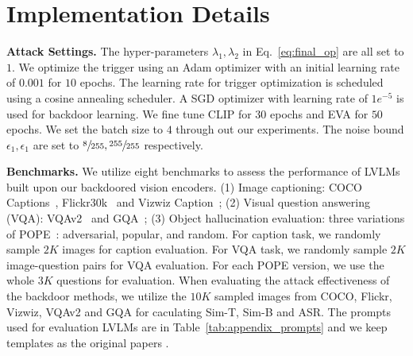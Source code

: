 \section{Implementation Details}
\label{appendix:imple_details}
\textbf{Attack Settings.} The hyper-parameters $\lambda_1, \lambda_2$ in Eq.~\ref{eq:final_op} are all set to $1$. We optimize the trigger using an Adam optimizer with an initial learning rate of $0.001$ for $10$ epochs. The learning rate for trigger optimization is scheduled using a cosine annealing scheduler. A SGD optimizer with learning rate of $1e^{-5}$ is used for backdoor learning. We fine tune CLIP for $30$ epochs and EVA for $50$ epochs. We set the batch size to $4$ through out our experiments. The noise bound $\epsilon_1, \epsilon_1$ are set to $\sfrac{8}{255}, \sfrac{255}{255}$ respectively.


\noindent \textbf{Benchmarks.} We utilize eight benchmarks to assess the performance of LVLMs built upon our backdoored vision encoders. (1) Image captioning: COCO Captions~\cite{chen2015microsoft}, Flickr30k~\cite{young2014image} and Vizwiz Caption~\cite{gurari2020captioning}; (2) Visual question answering (VQA): VQAv2~\cite{goyal2017making} and GQA~\cite{hudson2019gqa}; (3) Object hallucination evaluation: three variations of POPE~\cite{li2023evaluating}: adversarial, popular, and random. For caption task, we randomly sample $2K$ images for caption evaluation. For VQA task, we randomly sample $2K$ image-question pairs for VQA evaluation. For each POPE version, we use the whole $3K$ questions for evaluation. When evaluating the attack effectiveness of the backdoor methods, we utilize the $10K$ sampled images from COCO, Flickr, Vizwiz, VQAv2 and GQA for caculating Sim-T, Sim-B and ASR. The prompts used for evaluation LVLMs are in Table~\ref{tab:appendix_prompts} and we keep templates as the original papers \cite{liu2024improved,zhu2023minigpt}.
\begin{table}[h]
    \centering
    \caption{Prompts used for evaluation on caption tasks and VQA tasks.}
    \label{tab:appendix_prompts}
\end{table}

